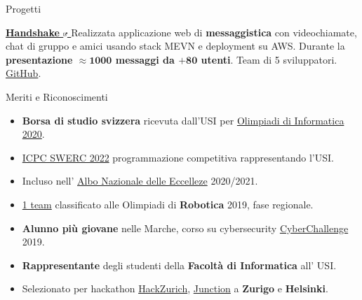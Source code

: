 \documentclass{cv} %
\def\intraexpvspace{0.15cm}
\begin{document}
\begin{minipage}[b][0.9\paperheight][t]{0.7\linewidth}
\begin{rSection}{Progetti}
        \vspace{\intraexpvspace}
        \item \textbf{\href{https://handshakeapp.ch}{
                Handshake
                \includegraphics[width=0.15cm, trim={10cm -10cm 0cm 0cm}]{ext-link-icon.png}
            }}
        {Realizzata applicazione web di \textbf{messaggistica} con videochiamate, chat di gruppo e amici
            usando stack MEVN e deployment su AWS.
            Durante la \textbf{presentazione $\boldsymbol{\approx1000}$ messaggi da $\boldsymbol{+ 80}$ utenti}.
            Team di 5 sviluppatori.
            \href{https://github.com/ogs-at-usi/handshake}{GitHub}.
        }
    \end{rSection}
    \begin{rSection}{Meriti e Riconoscimenti}
        \vspace{0.2cm}
        \begin{itemize}[leftmargin=*]
            \itemsep 0.2em
            \item \textbf{Borsa di studio svizzera} ricevuta dall'USI per
                  \href{https://www.olimpiadi-informatica.it/index.php/selezione-territoriale-20.html}{Olimpiadi di Informatica 2020}.

            \item \href{https://icpc.global/ICPCID/ZOI3HF9XDUH8}{ICPC SWERC 2022}
                  programmazione competitiva rappresentando l'USI.

            \item Incluso nell' \href{https://www.indire.it/eccellenze/}{Albo Nazionale delle Eccelleze} 2020/2021.

            \item \href{https://www.makerslab.it/olimpiadi-robotiche-ancona-2019/}{1 team}
                  classificato alle Olimpiadi di \textbf{Robotica} 2019, fase regionale. %

            \item \textbf{Alunno più giovane} nelle Marche, corso su cybersecurity
                  \href{https://cyberchallenge.it/}{CyberChallenge} 2019.

            \item \textbf{Rappresentante} degli studenti della \textbf{Facoltà di Informatica} all' USI.

            \item Selezionato per hackathon \href{https://hackzurich.com/}{HackZurich},
                  \href{https://www.junction2023.com/}{Junction}
                  a \textbf{Zurigo} e \textbf{Helsinki}.
        \end{itemize}
    \end{rSection}

\end{minipage}
\end{document}

